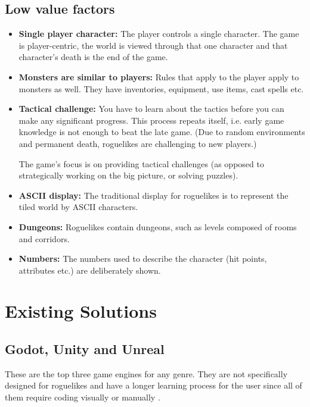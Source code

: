 \documentclass{article}
\begin{document}
\subsection*{Low value factors} 
\begin{itemize}
    \item \textbf{Single player character:}
    The player controls a single character. The game is player-centric, 
    the world is viewed through that one character and that character's 
    death is the end of the game. 
    
    \item \textbf{Monsters are similar to players:}
    Rules that apply to the player apply to monsters as well. They have 
    inventories, equipment, use items, cast spells etc. 
    
    \item \textbf{Tactical challenge:}
    You have to learn about the tactics before you can make any 
    significant progress. This process repeats itself, i.e. early game 
    knowledge is not enough to beat the late game. (Due to random 
    environments and permanent death, roguelikes are challenging to new 
    players.) 
    
    The game's focus is on providing tactical challenges (as opposed to 
    strategically working on the big picture, or solving puzzles). 
    
    \item \textbf{ASCII display:}
    The traditional display for roguelikes is to represent the tiled world 
    by ASCII characters. 
    
    \item \textbf{Dungeons:}
    Roguelikes contain dungeons, such as levels composed of rooms and 
    corridors. 
    
    \item \textbf{Numbers:}
    The numbers used to describe the character (hit points, attributes 
    etc.) are deliberately shown. 
\end{itemize}

\section{Existing Solutions}
\subsection{Godot, Unity and Unreal}
These are the top three game engines for any genre. They are not specifically designed for roguelikes and have a longer learning process for the user since all of them require coding visually or manually \cite{godot}\cite{unity}\cite{unreal}.\\
\end{document}
